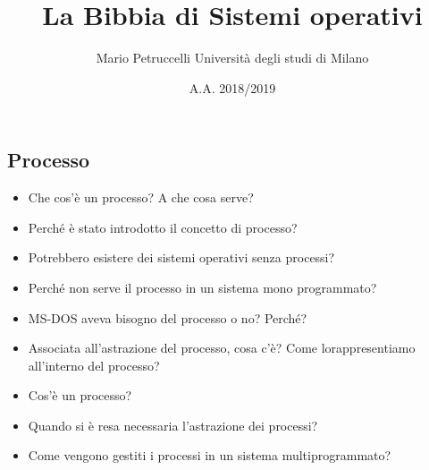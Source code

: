 \documentclass[12pt, letterpaper]{article}
\title{La Bibbia di Sistemi operativi}
\author{Mario Petruccelli \cr Università degli studi di Milano}
\date{A.A. 2018/2019}
\begin{document}
\begin{titlepage}
\maketitle
\newpage
\tableofcontents
\newpage

\section{Processo} 
	\begin{itemize}
		\item Che cos’è un processo? A che cosa serve?  
		\item Perché è stato introdotto il concetto di processo?  
		\item Potrebbero esistere dei sistemi operativi senza processi?  
		\item Perché non serve il processo in un sistema mono programmato?  
		\item MS-DOS aveva bisogno del processo o no? Perché?  
		\item Associata all’astrazione del processo, cosa c’è? Come lorappresentiamo  all’interno  del  processo?   
		\item Cos’è  un  processo?
		\item Quando  si  è  resa  necessaria  l’astrazione  dei  processi?
		\item Come vengono gestiti i processi  in  un  sistema  multiprogrammato? 
	\end{itemize}

\

\end{titlepage}
\end{document}
